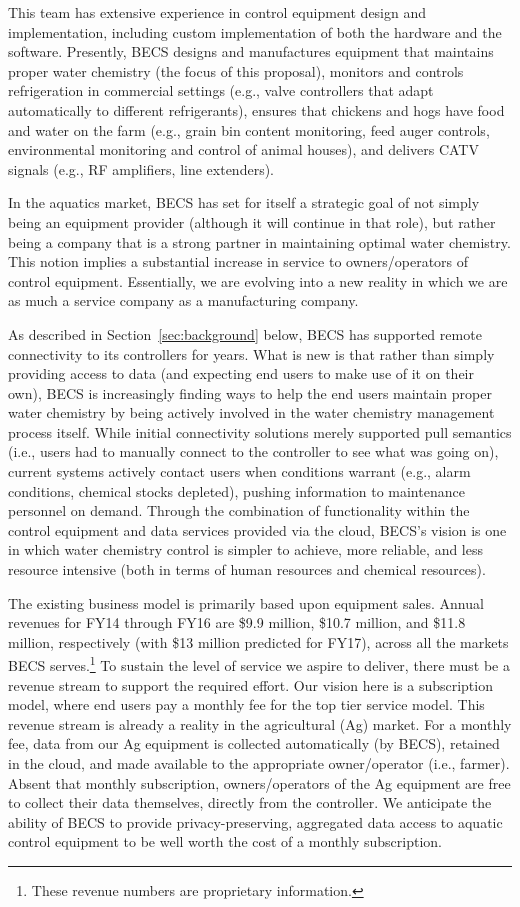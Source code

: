 This team has extensive experience in control equipment design and
implementation, including custom implementation of both the hardware and
the software. Presently, BECS designs and manufactures equipment that maintains
proper water chemistry (the focus of this proposal), monitors and controls
refrigeration in commercial settings (e.g., valve controllers that adapt
automatically to different refrigerants), ensures that chickens and hogs
have food and water on the farm (e.g., grain bin content monitoring,
feed auger controls, environmental monitoring and control of animal houses),
and delivers CATV signals (e.g., RF amplifiers, line extenders).

In the aquatics market, BECS has set for itself a strategic goal of not
simply being an equipment provider (although it will continue in that
role), but rather being a company that is a strong partner in maintaining
optimal water chemistry. This notion implies a substantial increase
in service to owners/operators of control equipment.
Essentially, we are evolving into a new reality in which we are as much a
service company as a manufacturing company.

As described in Section~\ref{sec:background} below, BECS has supported
remote connectivity to its controllers for years.  What is new is that
rather than simply providing access to data (and expecting end users
to make use of it on their own), BECS is increasingly finding ways to
help the end users maintain proper water chemistry by being actively involved
in the water chemistry management process itself.
While initial connectivity solutions
merely supported pull semantics (i.e., users had to
manually connect to the controller to
see what was going on), current systems actively contact users when
conditions warrant (e.g., alarm conditions, chemical stocks depleted),
pushing information to maintenance personnel on demand.
Through the combination of functionality within the control equipment 
and data services provided via the cloud, BECS's vision is one in
which water chemistry control is simpler to achieve, more reliable,
and less resource intensive (both in terms of human resources and
chemical resources).

The existing business model is primarily based upon equipment sales.
Annual revenues for FY14 through FY16 are \$9.9 million, \$10.7 million,
and \$11.8 million, respectively
(with \$13 million predicted for FY17), across all the markets BECS
serves.\footnote{These revenue numbers are proprietary information.}
To sustain the level of service we aspire to deliver, there must be
a revenue stream to support the required effort.  Our vision here is
a subscription model, where end users pay a monthly fee for the
top tier service model.
This revenue stream is already a reality in the agricultural (Ag) market.
For a monthly fee, data from our Ag equipment is collected automatically
(by BECS), retained in the cloud, and made available to the appropriate
owner/operator (i.e., farmer).  Absent that monthly subscription,
owners/operators of the Ag equipment are free to collect their data
themselves, directly from the controller.
We anticipate the ability of BECS to provide privacy-preserving,
aggregated data access to aquatic control equipment to be well worth
the cost of a monthly subscription.

